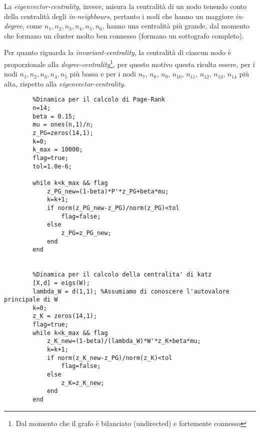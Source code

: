 \begin{alphaparts}
La \textit{eigenvector-centrality}, invece, misura la centralità di un nodo tenendo conto della centralità degli \textit{in-neighbours}, pertanto i nodi che hanno un maggiore \textit{in-degree}, come $n_1,n_2,n_3,n_4,n_5,n_6$, hanno una centralità più grande, dal momento che formano un cluster molto ben connesso (formano un sottografo completo).

Per quanto riguarda la \textit{invariant-centrality}, la centralità di ciascun nodo è proporzionale alla \textit{degree-centrality}\footnote{Dal momento che il grafo è bilanciato (undirected) e fortemente connesso}, per questo motivo questa risulta essere, per i nodi $n_1,n_2,n_3,n_4,n_5$ più bassa e per i nodi $n_7$, $n_8$, $n_9$, $n_{10}$, $n_{11}$, $n_{12}$, $n_{13}$, $n_{14}$ più alta, rispetto alla \textit{eigenvector-centrality}.

    \questionpart
    \begin{lstlisting}
        %Dinamica per il calcolo di Page-Rank
        n=14;
        beta = 0.15;
        mu = ones(n,1)/n;
        z_PG=zeros(14,1);
        k=0;
        k_max = 10000;
        flag=true;
        tol=1.0e-6;
        
        while k<k_max && flag
            z_PG_new=(1-beta)*P'*z_PG+beta*mu;
            k=k+1;
            if norm(z_PG_new-z_PG)/norm(z_PG)<tol
                flag=false;
            else
                z_PG=z_PG_new;
            end
        end
               
        
        %Dinamica per il calcolo della centralita' di katz
        [X,d] = eigs(W);
        lambda_W = d(1,1); %Assumiamo di conoscere l'autovalore principale di W
        k=0;
        z_K = zeros(14,1);
        flag=true;
        while k<k_max && flag
            z_K_new=(1-beta)/(lambda_W)*W'*z_K+beta*mu;
            k=k+1;
            if norm(z_K_new-z_PG)/norm(z_K)<tol
                flag=false;
            else
                z_K=z_K_new;
            end
        end
    \end{lstlisting}

    \questionpart


\end{alphaparts}
